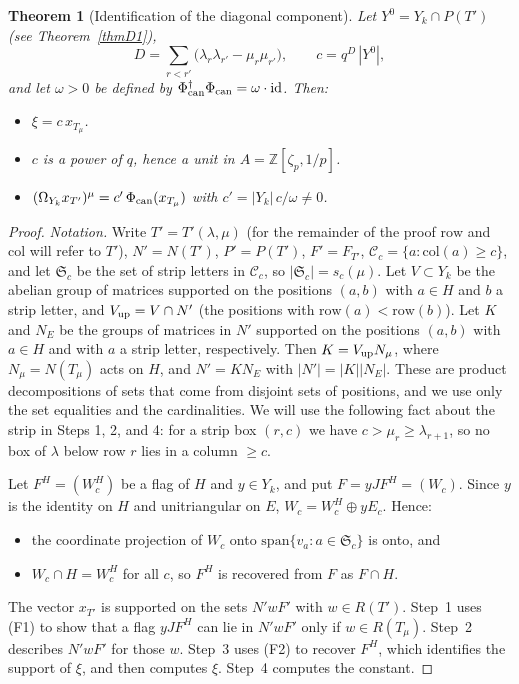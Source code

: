 \documentclass[11pt, letterpaper]{amsart}
\newtheorem{theorem}{Theorem}
\theoremstyle{definition}
\theoremstyle{remark}
\newcommand{\ZZ}{\mathbb{Z}}
\newcommand{\row}{\mathrm{row}}
\newcommand{\col}{\mathrm{col}}
\begin{document}
\begin{theorem}[Identification of the diagonal component]\label{thmD2}
Let $Y^0=Y_k\cap P(T')$ (see Theorem~\ref{thmD1}),
\[
D=\sum_{r<r'}\bigl(\lambda_r\lambda_{r'}-\mu_r\mu_{r'}\bigr),\qquad c=q^{D}\,|Y^0|,
\]
and let $\omega>0$ be defined by $\Phi_{\rm can}^\dagger\Phi_{\rm can}=\omega\cdot\mathrm{id}$. Then:
\begin{itemize}
\item[(i)] $\xi=c\,x_{T_\mu}$.
\item[(ii)] $c$ is a power of $q$, hence a unit in $A=\ZZ[\zeta_p,1/p]$.
\item[(iii)] $(\Omega_{Y_k}x_{T'})^\mu=c'\,\Phi_{\rm can}(x_{T_\mu})$ with $c'=|Y_k|\,c/\omega\ne0$.
\end{itemize}
\end{theorem}
\begin{proof}
\emph{Notation.} Write $T'=T'(\lambda,\mu)$ (for the remainder of the proof $\row$ and $\col$ will refer to $T'$), $N'=N(T')$, $P'=P(T')$, $F'=F_{T'}$, $\mathcal C_c=\{a:\col(a)\ge c\}$, and let $\mathfrak S_c$ be the set of strip letters in $\mathcal C_c$, so $|\mathfrak S_c|=s_c(\mu)$. Let $V\subset Y_k$ be the abelian group of matrices supported on the positions $(a,b)$ with $a\in H$ and $b$ a strip letter, and $V_{\rm up}=V\cap N'$ (the positions with $\row(a)<\row(b)$). Let $K$ and $N_E$ be the groups of matrices in $N'$ supported on the positions $(a,b)$ with $a\in H$ and with $a$ a strip letter, respectively. Then $K=V_{\rm up}N_\mu$, where $N_\mu=N(T_\mu)$ acts on $H$, and $N'=KN_E$ with $|N'|=|K||N_E|$. These are product decompositions of sets that come from disjoint sets of positions, and we use only the set equalities and the cardinalities. We will use the following fact about the strip in Steps 1, 2, and 4: for a strip box $(r,c)$ we have $c>\mu_r\ge\lambda_{r+1}$, so no box of $\lambda$ below row $r$ lies in a column $\ge c$.

Let $F^H=(W^H_c)$ be a flag of $H$ and $y\in Y_k$, and put $F=yJF^H=(W_c)$. Since $y$ is the identity on $H$ and unitriangular on $E$, $W_c=W^H_c\oplus yE_c$. Hence:
\begin{itemize}
\item[(F1)] the coordinate projection of $W_c$ onto $\mathrm{span}\{v_a:a\in\mathfrak S_c\}$ is onto, and
\item[(F2)] $W_c\cap H=W^H_c$ for all $c$, so $F^H$ is recovered from $F$ as $F\cap H$.
\end{itemize}

The vector $x_{T'}$ is supported on the sets $N'wF'$ with $w\in R(T')$. Step~1 uses (F1) to show that a flag $yJF^H$ can lie in $N'wF'$ only if $w\in R(T_\mu)$. Step~2 describes $N'wF'$ for those $w$. Step~3 uses (F2) to recover $F^H$, which identifies the support of $\xi$, and then computes $\xi$. Step~4 computes the constant.


\end{proof}
\end{document}
